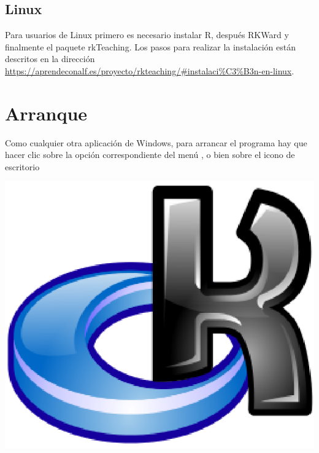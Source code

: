 \subsection{Linux}
Para usuarios de Linux primero es necesario instalar R, después RKWard y finalmente el paquete rkTeaching. Los pasos para realizar la instalación están descritos en la dirección \url{https://aprendeconalf.es/proyecto/rkteaching/#instalaci%C3%B3n-en-linux}.

\section{Arranque}
Como cualquier otra aplicación de Windows, para arrancar el programa hay que hacer clic sobre la opción
correspondiente del menú , o bien sobre el icono de escritorio
\begin{center}
  \includegraphics[scale=0.3]{capitulos/introduccion/img/icono-rkward}
\end{center}

